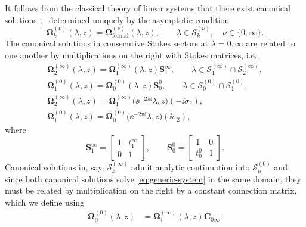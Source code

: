 It follows from the classical theory of linear systems that there exist canonical solutions ,~ determined uniquely by the asymptotic condition
\begin{equation}
\mathbf{\Omega}_k^{(\nu)}(\lambda, z) = \mathbf{\Omega}^{(\nu)}_{\text{formal}}(\lambda, z), \qquad \lambda \in \mathcal S_k^{(\nu)}, \quad \nu \in \{0, \infty\}.
\label{eq:psi-asymptotic-condition-D8}
\end{equation}
The canonical solutions in consecutive Stokes sectors at $\lambda=0,\infty$ are related to one another by multiplications on the right with Stokes matrices, i.e.,
\begin{gather}%
\label{eq:stokes-condition-D8-1}\mathbf{\Omega}_2^{(\infty)}(\lambda, z) = \mathbf{\Omega}_1^{(\infty)}(\lambda,z) \mathbf{S}^{\infty}_{1},\qquad \lambda\in \mathcal S_1^{(\infty)}\cap \mathcal S_2^{(\infty)},\\
\mathbf{\Omega}_1^{(0)}(\lambda, z) = \mathbf{\Omega}_0^{(0)}(\lambda, z) \mathbf{S}^{0}_{0}, \qquad \lambda\in \mathcal S_0^{(0)}\cap \mathcal S_1^{(0)}, \\
\mathbf{\Omega}_{2}^{(\infty)}(\lambda, z) = \mathbf{\Omega}_1^{(\infty)}\big(\ee^{-2\pi \ii} \lambda, z\big) (-\ii\sigma_2), \\
\label{eq:stokes-condition-D8-4}\mathbf{\Omega}_{1}^{(0)}(\lambda, z) = \mathbf{\Omega}_0^{(0)}\big(\ee^{-2\pi \ii} \lambda, z\big) (\ii\sigma_2),
\end{gather}
where
\begin{equation}
\mathbf{S}^\infty_{1}= \begin{bmatrix}1&t^\infty_1\\0&1\end{bmatrix},\qquad \mathbf{S}^0_{{0}}=
 \begin{bmatrix}1&0\\{t^0_0}&1\end{bmatrix} .
 \label{eq:Stokes-zero}
\end{equation}
Canonical solutions in, say, $\mathcal S_k^{(\infty)}$ admit analytic continuation into $\mathcal S_k^{(0)}$ and since both canonical solutions solve \eqref{eq:generic-system} in the same domain, they must be related by multiplication on the right by a constant connection matrix, which we define using
\begin{align}
\mathbf{\Omega}_0^{(0)}(\lambda, z) &= \mathbf{\Omega}_1^{(\infty)}(\lambda, z) \mathbf{C}_{0\infty}.
\label{eq:connection-matrix-D8}
\end{align}


